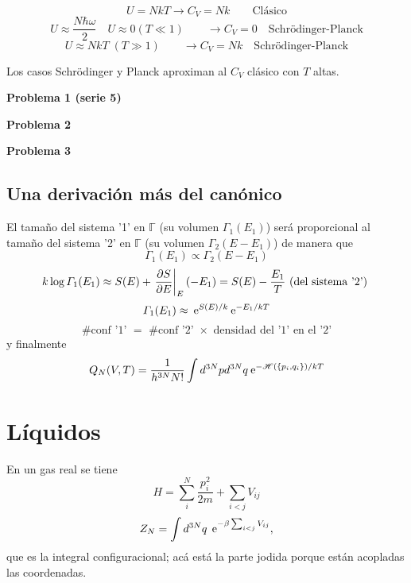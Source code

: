 \documentclass[10pt,oneside]{CBFT_book}
\begin{document}
\[
	U = NkT \rightarrow C_V = Nk  \qquad \text{Clásico}
\]
\[
	U \approx \frac{N\hbar\omega}{2} \quad U \approx 0 (T\ll 1) \qquad \rightarrow C_V = 0 
	\quad \text{Schrödinger-Planck}
\]
\[
	U \approx N kT \; (T \gg 1) \qquad \rightarrow C_V = Nk 
	\quad \text{Schrödinger-Planck}
\]

Los casos Schrödinger y Planck aproximan al $C_V$ clásico con $T$ altas.

\begin{ejemplo}{\bf Problema 1 (serie 5)}
 
\end{ejemplo}

\begin{ejemplo}{\bf Problema 2}
 
\end{ejemplo}

\begin{ejemplo}{\bf Problema 3}
 
\end{ejemplo}

\subsection{Una derivación más del canónico}

El tamaño del sistema '1' en $\mathbb{\Gamma}$ (su volumen $\Gamma_1(E_1)$) será proporcional al tamaño del sistema 
'2' en $\mathbb{\Gamma}$ (su volumen $\Gamma_2(E-E_1)$) de manera que 
\[
	\Gamma_1(E_1) \propto \Gamma_2(E-E_1)
\]
\[
	k\log \Gamma_1(E_1) \approx S(E) + \left.\frac{\partial^{\hspace{-0.05em}} {S}}{\partial {E}^{\hspace{-0.05em}}}\right|_E (-E_1) = S(E) - \frac{E_1}{T} 
	\text{ (del sistema '2') }
\]
\[
	\Gamma_1(E_1) \approx \:\mathrm{e}^{S(E)/k} \:\mathrm{e}^{-E_1/kT} 
\]
\[
	\text{ \# conf '1' } = \text{ \# conf '2' } \times \text{ densidad del '1' en el '2' }
\]
y finalmente
\[
	Q_N (V,T) = \frac{1}{h^{3N}N!} \int d^{3N}p d^{3N}q \:\mathrm{e}^{-\mathscr{H}(\{ p_i,q_i\})/kT}
\]

\section{Líquidos}

En un gas real se tiene
\[
	H = \sum_i^N \frac{p_i^2}{2m} + \sum_{i<j} V_{ij}
\]
\[
	Z_N = \int d^{3N}q \: \:\mathrm{e}^{ - \beta \sum_{i<j} V_{ij} },
\]
que es la integral configuracional; acá está la parte jodida porque están acopladas las coordenadas.
\end{document}
